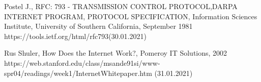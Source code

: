 \documentclass[magisterska,en]{pracamgr}
\begin{document}
\begin{thebibliography}{9}
Postel J., RFC: 793 - TRANSMISSION CONTROL PROTOCOL,DARPA INTERNET PROGRAM, PROTOCOL SPECIFICATION, Information Sciences Institute, University of Southern California, September 1981
https://tools.ietf.org/html/rfc793(30.01.2021)


Rus Shuler, How Does the Internet Work?,  Pomeroy IT Solutions, 2002
https://web.stanford.edu/class/msande91si/www-spr04/readings/week1/InternetWhitepaper.htm (31.01.2021)

\end{thebibliography}
\end{document}

